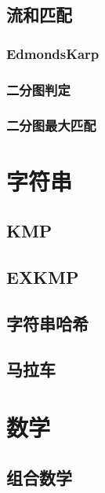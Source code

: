 \subsection{流和匹配}
\subsubsection{EdmondsKarp}


\subsubsection{二分图判定}


\subsubsection{二分图最大匹配}


\section{字符串}
\subsection{KMP}


\subsection{EXKMP}


\subsection{字符串哈希}


\subsection{马拉车}


\section{数学}
\subsection{组合数学}
